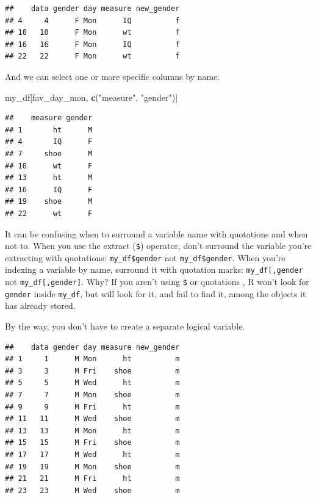 \documentclass[]{article}
\newenvironment{Shaded}{\begin{snugshade}}{\end{snugshade}}
\newcommand{\KeywordTok}[1]{\textcolor[rgb]{0.13,0.29,0.53}{\textbf{#1}}}
\newcommand{\StringTok}[1]{\textcolor[rgb]{0.31,0.60,0.02}{#1}}
\newcommand{\OperatorTok}[1]{\textcolor[rgb]{0.81,0.36,0.00}{\textbf{#1}}}
\newcommand{\NormalTok}[1]{#1}
\begin{document}
\begin{verbatim}
##    data gender day measure new_gender
## 4     4      F Mon      IQ          f
## 10   10      F Mon      wt          f
## 16   16      F Mon      IQ          f
## 22   22      F Mon      wt          f
\end{verbatim}

And we can select one or more specific columns by name.

\begin{Shaded}
\begin{Highlighting}[]
\NormalTok{my_df[fav_day_mon, }\KeywordTok{c}\NormalTok{(}\StringTok{"measure"}\NormalTok{, }\StringTok{"gender"}\NormalTok{)]}
\end{Highlighting}
\end{Shaded}

\begin{verbatim}
##    measure gender
## 1       ht      M
## 4       IQ      F
## 7     shoe      M
## 10      wt      F
## 13      ht      M
## 16      IQ      F
## 19    shoe      M
## 22      wt      F
\end{verbatim}

It can be confusing when to surround a variable name with quotations and
when not to. When you use the extract (\texttt{\$}) operator, don't
surround the variable you're extracting with quotations:
\texttt{my\_df\$gender} not
\texttt{my\_df\$\textquotesingle{}gender\textquotesingle{}}. When you're
indexing a variable by name, surround it with quotation marks:
\texttt{my\_df{[},\textquotesingle{}gender\textquotesingle{}{]}} not
\texttt{my\_df{[},gender{]}}. Why? If you aren't using \texttt{\$} or
quotations \texttt{\textquotesingle{}\textquotesingle{}}, R won't look
for \texttt{gender} inside \texttt{my\_df}, but will look for it, and
fail to find it, among the objects it has already stored.

By the way, you don't have to create a separate logical variable.

\begin{Shaded}
\end{Shaded}

\begin{verbatim}
##    data gender day measure new_gender
## 1     1      M Mon      ht          m
## 3     3      M Fri    shoe          m
## 5     5      M Wed      ht          m
## 7     7      M Mon    shoe          m
## 9     9      M Fri      ht          m
## 11   11      M Wed    shoe          m
## 13   13      M Mon      ht          m
## 15   15      M Fri    shoe          m
## 17   17      M Wed      ht          m
## 19   19      M Mon    shoe          m
## 21   21      M Fri      ht          m
## 23   23      M Wed    shoe          m
\end{verbatim}
\end{document}
